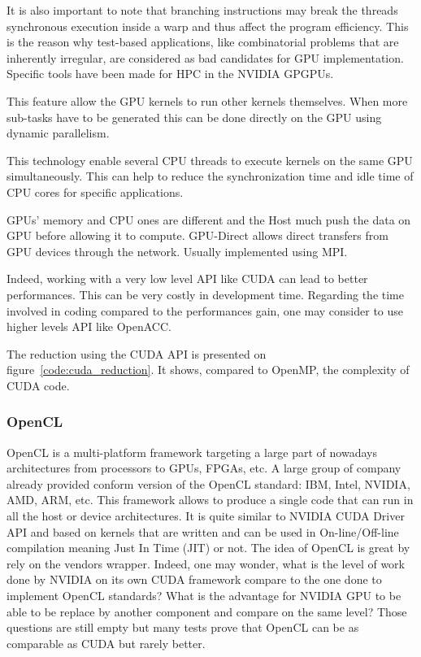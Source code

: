 It is also important to note that branching instructions may break the threads synchronous execution inside a warp and thus affect the program efficiency. 
This is the reason why test-based applications, like combinatorial problems that are inherently irregular, are considered as bad candidates for GPU implementation.\\ 

Specific tools have been made for HPC in the NVIDIA GPGPUs. 
\begin{description}
  \item[Dynamic Parallelism] This feature allow the GPU kernels to run other kernels themselves. When more sub-tasks have to be generated this can be done directly on the GPU using dynamic parallelism.
  \item[Hyper-Q] This technology enable several CPU threads to execute kernels on the same GPU simultaneously. This can help to reduce the synchronization time and idle time of CPU cores for specific applications.
  \item[NVIDIA GPU-Direct] GPUs' memory and CPU ones are different and the Host much push the data on GPU before allowing it to compute. GPU-Direct allows direct transfers from GPU devices through the network. Usually implemented using MPI.  
\end{description}

Indeed, working with a very low level API like CUDA can lead to better performances. 
This can be very costly in development time. 
Regarding the time involved in coding compared to the performances gain, one may consider to use higher levels API like OpenACC. 

The reduction using the CUDA API is presented on figure~\ref{code:cuda_reduction}.
It shows, compared to OpenMP, the complexity of CUDA code. 

\subsubsection{OpenCL}
OpenCL is a multi-platform framework targeting a large part of nowadays architectures from processors to GPUs, FPGAs, etc.
A large group of company already provided conform version of the OpenCL standard: IBM, Intel, NVIDIA, AMD, ARM, etc.
This framework allows to produce a single code that can run in all the host or device architectures. 
It is quite similar to NVIDIA CUDA Driver API and based on kernels that are written and can be used in On-line/Off-line compilation meaning Just In Time (JIT) or not. 
The idea of OpenCL is great by rely on the vendors wrapper.
Indeed, one may wonder, what is the level of work done by NVIDIA on its own CUDA framework compare to the one done to implement OpenCL standards? 
What is the advantage for NVIDIA GPU to be able to be replace by another component and compare on the same level? 
Those questions are still empty but many tests prove that OpenCL can be as comparable as CUDA but rarely better\cite{karimi2010performance,fang2011comprehensive}. 

